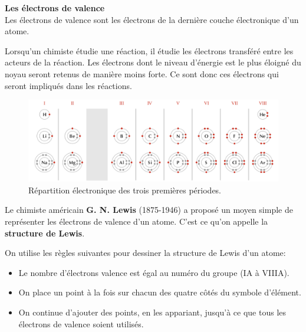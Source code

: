 \documentclass[
  11pt,
  a4paper,
  openany]{book}
\providecommand{\tightlist}{%
  \setlength{\itemsep}{0pt}\setlength{\parskip}{0pt}}
\begin{document}
\begin{tcolorbox}
\textbf{Les électrons de valence}\\
Les électrons de valence sont les électrons de la dernière couche électronique d'un atome.

\end{tcolorbox}

Lorsqu'un chimiste étudie une réaction, il étudie les électrons transféré entre les acteurs de la réaction. Les électrons dont le niveau d'énergie est le plus éloigné du noyau seront retenus de manière moins forte. Ce sont donc ces électrons qui seront impliqués dans les réactions.

\begin{figure}

{\centering \includegraphics[width=1\linewidth]{images/configuration-electronique} 

}

\caption{Répartition électronique des trois premières périodes.}\label{fig:configuration-electronique}
\end{figure}

Le chimiste américain \textbf{G. N. Lewis} (1875-1946) a proposé un moyen simple de représenter les électrons de valence d'un atome. C'est ce qu'on appelle la \textbf{structure de Lewis}.

On utilise les règles suivantes pour dessiner la structure de Lewis d'un atome:

\begin{itemize}
\tightlist
\item
  Le nombre d'électrons valence est égal au numéro du groupe (IA à VIIIA).
\item
  On place un point à la fois sur chacun des quatre côtés du symbole d'élément.
\item
  On continue d'ajouter des points, en les appariant, jusqu'à ce que tous les électrons de valence soient utilisés.
\end{itemize}
\end{document}
